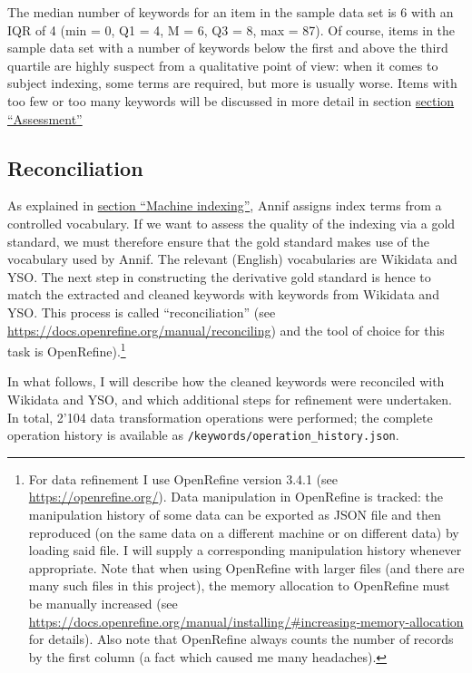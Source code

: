 The median number of keywords for an item in the sample data set is 6
with an IQR of 4 (min = 0, Q1 = 4, M = 6, Q3 = 8, max = 87). Of course,
items in the sample data set with a number of keywords below the first
and above the third quartile are highly suspect from a qualitative point
of view: when it comes to subject indexing, some terms are required, but
more is usually worse. Items with too few or too many keywords will be
discussed in more detail in section
\protect\hyperlink{assessment}{section ``Assessment''}

\hypertarget{reconciliation}{%
\subsection{Reconciliation}\label{reconciliation}}

As explained in \protect\hyperlink{machine-indexing}{section ``Machine
indexing''}, Annif assigns index terms from a controlled vocabulary. If
we want to assess the quality of the indexing via a gold standard, we
must therefore ensure that the gold standard makes use of the vocabulary
used by Annif. The relevant (English) vocabularies are Wikidata and YSO.
The next step in constructing the derivative gold standard is hence to
match the extracted and cleaned keywords with keywords from Wikidata and
YSO. This process is called ``reconciliation'' (see
\url{https://docs.openrefine.org/manual/reconciling}) and the tool of
choice for this task is OpenRefine).\footnote{For data refinement I use
  OpenRefine version 3.4.1 (see \url{https://openrefine.org/}). Data
  manipulation in OpenRefine is tracked: the manipulation history of
  some data can be exported as JSON file and then reproduced (on the
  same data on a different machine or on different data) by loading said
  file. I will supply a corresponding manipulation history whenever
  appropriate. Note that when using OpenRefine with larger files (and
  there are many such files in this project), the memory allocation to
  OpenRefine must be manually increased (see
  \url{https://docs.openrefine.org/manual/installing/\#increasing-memory-allocation}
  for details). Also note that OpenRefine always counts the number of
  records by the first column (a fact which caused me many headaches).}

In what follows, I will describe how the cleaned keywords were
reconciled with Wikidata and YSO, and which additional steps for
refinement were undertaken. In total, 2'104 data transformation
operations were performed; the complete operation history is available
as \texttt{/keywords/operation\_history.json}.

